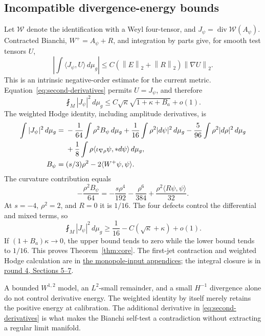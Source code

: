 \documentclass[11pt,a4paper]{article}
\theoremstyle{definition}
\theoremstyle{remark}
\DeclareMathOperator{\diver}{div}
\newcommand{\dd}{\,d\mu_g}
\newcommand{\avg}[1]{\fint_M #1\dd}
\newcommand{\norm}[1]{\left\|#1\right\|}
\newcommand{\roundref}[2]{\href{run:../references/rounds/#1}{#2}}
\numberwithin{equation}{section}
\begin{document}
\subsection{Incompatible divergence-energy bounds}\label{sub:contradiction}
Let $\mathcal W$ denote the identification with a Weyl four-tensor, and
$J_\psi=\diver\mathcal W(A_\psi)$. Contracted Bianchi,
$W^+=A_\psi+R$, and integration by parts give, for smooth test tensors $U$,
\begin{equation}\label{eq:weak-Bianchi}
 \left|\int\langle J_\psi,U\rangle\dd\right|
       \le C(\norm E_2+\norm R_2)\norm{\nabla U}_2.
\end{equation}
This is an intrinsic negative-order estimate for the current metric.
Equation~\eqref{eq:second-derivatives} permits $U=J_\psi$, and therefore
\begin{equation}\label{eq:J-upper}
 \avg{|J_\psi|^2}\le C\sqrt\kappa\sqrt{1+\kappa+B_a}+o(1).
\end{equation}
The weighted Hodge identity, including amplitude derivatives, is
\begin{align}
 \int|J_\psi|^2\dd={}&-\frac1{64}\int\rho^2B_\psi\dd
          +\frac1{16}\int\rho^2|d\psi|^2\dd
          -\frac5{96}\int\rho^2|d\rho|^2\dd\notag\\
 &+\frac18\int\rho\langle\iota_{\nabla\rho}\psi,*d\psi\rangle\dd,
                                                        \label{eq:weighted-Hodge}\\
 B_\psi={}&(s/3)\rho^2-2\langle W^+\psi,\psi\rangle.\notag
\end{align}
The curvature contribution equals
\[
 -\frac{\rho^2B_\psi}{64}
 =-\frac{s\rho^4}{192}-\frac{\rho^6}{384}
                    +\frac{\rho^2\langle R\psi,\psi\rangle}{32}.
\]
At $s=-4$, $\rho^2=2$, and $R=0$ it is $1/16$.
The four defects control the differential and mixed terms, so
\begin{equation}\label{eq:J-lower}
 \avg{|J_\psi|^2}\ge\frac1{16}-C(\sqrt\kappa+\kappa)+o(1).
\end{equation}
If $(1+B_a)\kappa\to0$, the upper bound tends to zero while the lower
bound tends to $1/16$. This proves Theorem~\ref{thm:core}.
The first-jet contraction and weighted Hodge calculation are in
\roundref{round3_monopole_input.md}{the monopole-input appendices};
the integral closure is in \roundref{round4_rigidity.md}{round 4,
Sections 5--7}.

A bounded $W^{1,2}$ model, an $L^2$-small remainder, and a small
$H^{-1}$ divergence alone do not control derivative energy. The weighted
identity by itself merely retains the positive energy at calibration.
The additional derivative in \eqref{eq:second-derivatives} is what makes
the Bianchi self-test a contradiction without extracting a regular
limit manifold.
\end{document}
